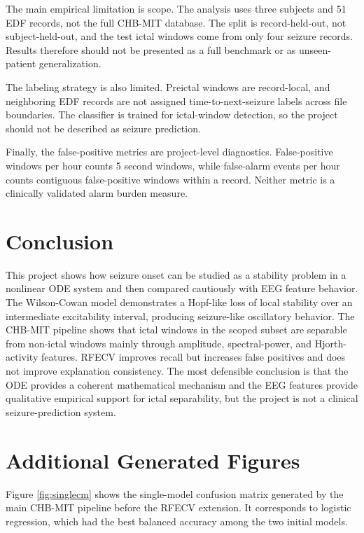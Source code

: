 \documentclass[11pt]{article}
\begin{document}
The main empirical limitation is scope. The analysis uses three subjects and 51 EDF records, not the full CHB-MIT database. The split is record-held-out, not subject-held-out, and the test ictal windows come from only four seizure records. Results therefore should not be presented as a full benchmark or as unseen-patient generalization.

The labeling strategy is also limited. Preictal windows are record-local, and neighboring EDF records are not assigned time-to-next-seizure labels across file boundaries. The classifier is trained for ictal-window detection, so the project should not be described as seizure prediction.

Finally, the false-positive metrics are project-level diagnostics. False-positive windows per hour counts 5 second windows, while false-alarm events per hour counts contiguous false-positive windows within a record. Neither metric is a clinically validated alarm burden measure.

\section{Conclusion}

This project shows how seizure onset can be studied as a stability problem in a nonlinear ODE system and then compared cautiously with EEG feature behavior. The Wilson-Cowan model demonstrates a Hopf-like loss of local stability over an intermediate excitability interval, producing seizure-like oscillatory behavior. The CHB-MIT pipeline shows that ictal windows in the scoped subset are separable from non-ictal windows mainly through amplitude, spectral-power, and Hjorth-activity features. RFECV improves recall but increases false positives and does not improve explanation consistency. The most defensible conclusion is that the ODE provides a coherent mathematical mechanism and the EEG features provide qualitative empirical support for ictal separability, but the project is not a clinical seizure-prediction system.

\clearpage
\appendix
\section{Additional Generated Figures}

Figure \ref{fig:singlecm} shows the single-model confusion matrix generated by the main CHB-MIT pipeline before the RFECV extension. It corresponds to logistic regression, which had the best balanced accuracy among the two initial models.
\end{document}
